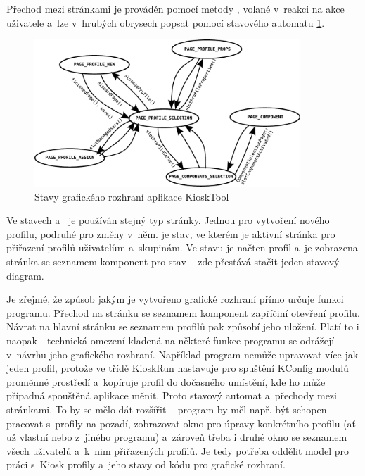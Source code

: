 Přechod mezi stránkami je prováděn pomocí metody , volané v~reakci na akce uživatele a~lze v~hrubých obrysech popsat pomocí stavového automatu \ref{fig:kioskstates}.

\begin{figure}[h]
    \centering
    \includegraphics[width=10cm]{obrazky/stated.pdf}
    \caption{Stavy grafického rozhraní aplikace KioskTool}
    \label{fig:kioskstates}
\end{figure}

Ve stavech  a~ je používán stejný typ stránky. Jednou pro vytvoření nového profilu, podruhé pro změny v~něm.\linebreak {} je stav, ve kterém je aktivní stránka pro přiřazení profilů uživatelům a~skupinám. Ve stavu  je načten profil a~je zobrazena stránka se seznamem komponent pro stav  -- zde přestává stačit jeden stavový diagram.

Je zřejmé, že způsob jakým je vytvořeno grafické rozhraní přímo určuje funkci programu. Přechod na stránku se seznamem komponent zapříčiní otevření profilu. Návrat na hlavní stránku se seznamem profilů pak způsobí jeho uložení. Platí to i naopak - technická omezení kladená na některé funkce programu se odrážejí v~návrhu jeho grafického rozhraní. Například program nemůže upravovat více jak jeden profil, protože ve třídě KioskRun nastavuje pro spuštění KConfig modulů proměnné prostředí a~kopíruje profil do dočasného umístění, kde ho může případná spouštěná aplikace měnit. Proto stavový automat a~přechody mezi stránkami. To by se mělo dát rozšířit -- program by měl např. být schopen pracovat s~profily na pozadí, zobrazovat okno pro úpravy konkrétního profilu (ať už vlastní nebo z~jiného programu) a~zároveň třeba i druhé okno se seznamem všech uživatelů a~k~nim přiřazených profilů. Je tedy potřeba oddělit model pro práci s~Kiosk profily a~jeho stavy od kódu pro grafické rozhraní.

